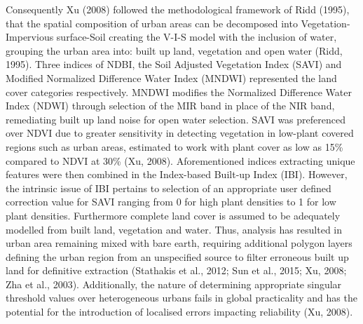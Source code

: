 \documentclass[]{book}
\begin{document}
Consequently Xu (2008) followed the methodological framework of Ridd
(1995), that the spatial composition of urban areas can be decomposed
into Vegetation-Impervious surface-Soil creating the V-I-S model with
the inclusion of water, grouping the urban area into: built up land,
vegetation and open water (Ridd, 1995). Three indices of NDBI, the Soil
Adjusted Vegetation Index (SAVI) and Modified Normalized Difference
Water Index (MNDWI) represented the land cover categories respectively.
MNDWI modifies the Normalized Difference Water Index (NDWI) through
selection of the MIR band in place of the NIR band, remediating built up
land noise for open water selection. SAVI was preferenced over NDVI due
to greater sensitivity in detecting vegetation in low-plant covered
regions such as urban areas, estimated to work with plant cover as low
as 15\% compared to NDVI at 30\% (Xu, 2008). Aforementioned indices
extracting unique features were then combined in the Index-based
Built-up Index (IBI). However, the intrinsic issue of IBI pertains to
selection of an appropriate user defined correction value for SAVI
ranging from 0 for high plant densities to 1 for low plant densities.
Furthermore complete land cover is assumed to be adequately modelled
from built land, vegetation and water. Thus, analysis has resulted in
urban area remaining mixed with bare earth, requiring additional polygon
layers defining the urban region from an unspecified source to filter
erroneous built up land for definitive extraction (Stathakis et al.,
2012; Sun et al., 2015; Xu, 2008; Zha et al., 2003). Additionally, the
nature of determining appropriate singular threshold values over
heterogeneous urbans fails in global practicality and has the potential
for the introduction of localised errors impacting reliability (Xu,
2008).
\end{document}
